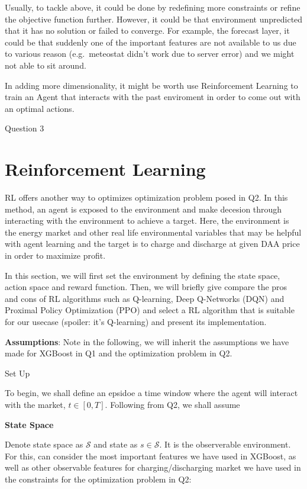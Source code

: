 \documentclass[11pt]{article}
\begin{document}
Usually, to tackle above, it could be done by redefining more
constraints or refine the objective function further. However, it could
be that environment unpredicted that it has no solution or failed to
converge. For example, the forecast layer, it could be that suddenly one
of the important features are not available to us due to various reason
(e.g.~meteostat didn't work due to server error) and we might not able
to sit around.

In adding more dimensionality, it might be worth use Reinforcement
Learning to train an Agent that interacts with the past enviroment in
order to come out with an optimal actions.

    Question 3

    \section{\texorpdfstring{{\textbf{Reinforcement
Learning}}}{Reinforcement Learning}}\label{reinforcement-learning}

RL offers another way to optimizes optimization problem posed in Q2. In
this method, an agent is exposed to the environment and make decesion
through interacting with the environment to achieve a target. Here, the
environment is the energy market and other real life environmental
variables that may be helpful with agent learning and the target is to
charge and discharge at given DAA price in order to maximize profit.

In this section, we will first set the environment by defining the state
space, action space and reward function. Then, we will briefly give
compare the pros and cons of RL algorithms such as Q-learning, Deep
Q-Networks (DQN) and Proximal Policy Optimization (PPO) and select a RL
algorithm that is suitable for our usecase (spoiler: it's Q-learning)
and present its implementation.

{\textbf{Assumptions}}: Note in the following, we will inherit the
assumptions we have made for XGBoost in Q1 and the optimization problem
in Q2.

    Set Up

To begin, we shall define an epsidoe a time window where the agent will
interact with the market, \(t \in [0,T]\). Following from Q2, we shall
assume

{\textbf{State Space}}

Denote state space as \(\mathcal{S}\) and state as
\(s \in \mathcal{S}\). It is the observerable environment. For this, can
consider the most important features we have used in XGBoost, as well as
other observable features for charging/discharging market we have used
in the constraints for the optimization problem in Q2:
\end{document}
